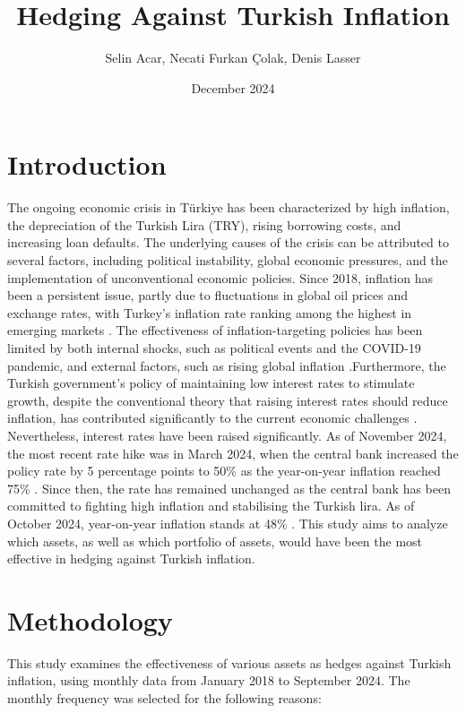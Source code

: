 \documentclass[
]{article}
\title{Hedging Against Turkish Inflation}
\author{Selin Acar, Necati Furkan Çolak, Denis Lasser}
\date{December 2024}
\begin{document}
\maketitle

{
\setcounter{tocdepth}{2}
\tableofcontents
}
\pagebreak

\section{Introduction}\label{introduction}

The ongoing economic crisis in Türkiye has been characterized by high
inflation, the depreciation of the Turkish Lira (TRY), rising borrowing
costs, and increasing loan defaults. The underlying causes of the crisis
can be attributed to several factors, including political instability,
global economic pressures, and the implementation of unconventional
economic policies. Since 2018, inflation has been a persistent issue,
partly due to fluctuations in global oil prices and exchange rates, with
Turkey's inflation rate ranking among the highest in emerging markets
\citet{yilmazkuday_2022}. The effectiveness of inflation-targeting policies
has been limited by both internal shocks, such as political events and
the COVID-19 pandemic, and external factors, such as rising global
inflation \citep{nazlioglu_2024}.Furthermore, the Turkish
government's policy of maintaining low interest rates to stimulate
growth, despite the conventional theory that raising interest rates
should reduce inflation, has contributed significantly to the current
economic challenges \citep{kantur_ozcan_2021}. Nevertheless, interest
rates have been raised significantly. As of November 2024, the most
recent rate hike was in March 2024, when the central bank increased the
policy rate by 5 percentage points to 50\% as the year-on-year inflation
reached 75\% \citep{bloomberg_2024}. Since then, the rate has remained
unchanged as the central bank has been committed to fighting high
inflation and stabilising the Turkish lira. As of October 2024,
year-on-year inflation stands at 48\% \citep{bloomberg_2024}. This study aims
to analyze which assets, as well as which portfolio of assets, would
have been the most effective in hedging against Turkish inflation.

\section{Methodology}\label{methodology}

This study examines the effectiveness of various assets as hedges
against Turkish inflation, using monthly data from January 2018 to
September 2024. The monthly frequency was selected for the following
reasons:
\end{document}
